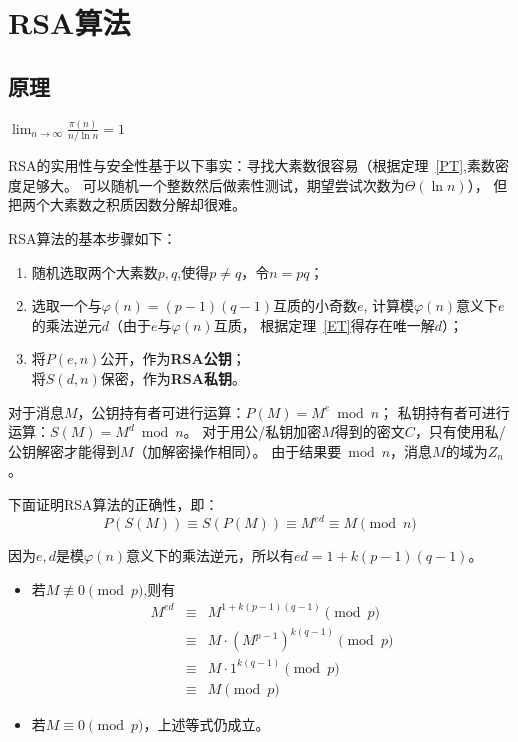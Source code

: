 \section{RSA算法}
\subsection{原理}
\begin{theorem}[素数定理]\label{PT}
	$\displaystyle \lim_{n\rightarrow\infty}\frac{\pi(n)}{n/\ln n}=1$
\end{theorem}
RSA的实用性与安全性基于以下事实：寻找大素数很容易（根据定理~\ref{PT},素数密度足够大。
可以随机一个整数然后做素性测试，期望尝试次数为$\Theta(\ln n)$），
但把两个大素数之积质因数分解却很难。

RSA算法的基本步骤如下：
\begin{enumerate}
	\item 随机选取两个大素数$p,q$,使得$p\neq q$，令$n=pq$；
	\item 选取一个与$\varphi(n)=(p-1)(q-1)$互质的小奇数$e$,
		  计算模$\varphi(n)$意义下$e$的乘法逆元$d$（由于$e$与$\varphi(n)$互质，
		  根据定理~\ref{ET}得存在唯一解$d$）；
	\item 将$P(e,n)$公开，作为{\bfseries RSA公钥}；\\
	      将$S(d,n)$保密，作为{\bfseries RSA私钥}。
\end{enumerate}

对于消息$M$，公钥持有者可进行运算：$P(M)=M^e \bmod n$；
私钥持有者可进行运算：$S(M)=M^d \bmod n$。
对于用公/私钥加密$M$得到的密文$C$，只有使用私/公钥解密才能得到$M$（加解密操作相同）。
由于结果要$\bmod n$，消息$M$的域为$Z_n$。

下面证明RSA算法的正确性，即：
\begin{displaymath}
	P(S(M))\equiv S(P(M))\equiv M^{ed}\equiv M \pmod{n}
\end{displaymath}

因为$e,d$是模$\varphi(n)$意义下的乘法逆元，所以有$ed=1+k(p-1)(q-1)$。

\begin{itemize}
	\item 若$M\not\equiv 0 \pmod{p}$,则有
	      \begin{eqnarray*}
		      M^{ed}&\equiv& M^{1+k(p-1)(q-1)} \pmod{p}\\
		      &\equiv& M\cdot (M^{p-1})^{k(q-1)} \pmod{p}\\
		      &\equiv& M\cdot 1^{k(q-1)} \pmod{p}\\
		      &\equiv& M \pmod{p}
	      \end{eqnarray*}
	\item 若$M\equiv 0 \pmod{p}$，上述等式仍成立。
\end{itemize}

